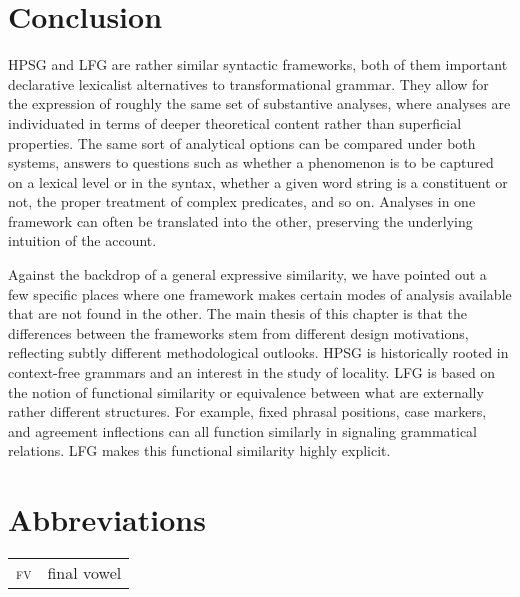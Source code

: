 \section{Conclusion}

HPSG and LFG  are rather similar syntactic frameworks, both of them important declarative lexicalist alternatives to transformational grammar.  They allow for the expression of roughly the same set of substantive analyses, where analyses are individuated in terms of deeper theoretical content rather than superficial properties.  The same sort of analytical options can be compared under both systems, answers to questions such as whether a phenomenon is to be captured on a lexical level or in the syntax, whether a given word string is a constituent or not, the proper treatment of complex predicates, and so on.   Analyses in one framework can often be translated into the other, preserving the underlying intuition of the account.   %

Against the backdrop of a general expressive similarity, we have pointed out a few specific places where one framework makes certain modes of analysis available that are not found in the other.   The main thesis of this chapter is that the differences between the frameworks stem from different design motivations, reflecting subtly different methodological outlooks.  HPSG is historically rooted in context-free grammars and an interest in the study of locality.  LFG is based on the notion of functional similarity or equivalence between what are externally rather different structures. For example, fixed phrasal positions, case markers, and agreement inflections can all function similarly in signaling grammatical relations.  LFG makes this  functional similarity highly explicit.
 
\section*{Abbreviations}

\begin{tabularx}{.99\textwidth}{@{}lX}
\textsc{fv} & final vowel\\
\end{tabularx}


\printbibliography[heading=subbibliography,notkeyword=this] 
%
%
\let\upashtmp\up


